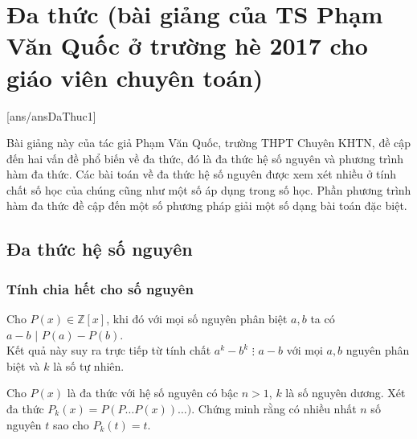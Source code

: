 \section{Đa thức (bài giảng của TS Phạm Văn Quốc ở trường hè 2017 cho giáo viên chuyên toán)}
[ans/ansDaThuc1]

Bài giảng này của tác giả Phạm Văn Quốc, trường THPT Chuyên KHTN, đề cập đến hai vấn đề phổ biến về đa thức, đó là đa thức hệ số nguyên và phương trình hàm đa thức. Các bài toán về đa thức hệ số nguyên được xem xét nhiều ở tính chất số học của chúng cũng như một số áp dụng trong số học. Phần phương trình hàm đa thức đề cập đến một số phương pháp giải một số dạng bài toán đặc biệt.
\subsection{Đa thức hệ số nguyên}
\subsubsection{Tính chia hết cho số nguyên}
\begin{bode}
Cho $P(x)\in\mathbb{Z}[x]$, khi đó với mọi số nguyên phân biệt $a,b$ ta có $a-b\,\, |\,\, P(a)-P(b)$.\\
Kết quả này suy ra trực tiếp từ tính chất $a^k-b^k\,\,\vdots\,\, a-b$ với mọi $a,b$ nguyên phân biệt và $k$ là số tự nhiên.
\end{bode}

\begin{bt}
Cho $P(x)$ là đa thức với hệ số nguyên có bậc $n>1$, $k$ là số nguyên dương. Xét đa thức $P_k(x)=P(P\ldots P(x))\ldots)$. Chứng minh rằng có nhiều nhất $n$ số nguyên $t$ sao cho $P_k(t)=t$.
\end{bt}

